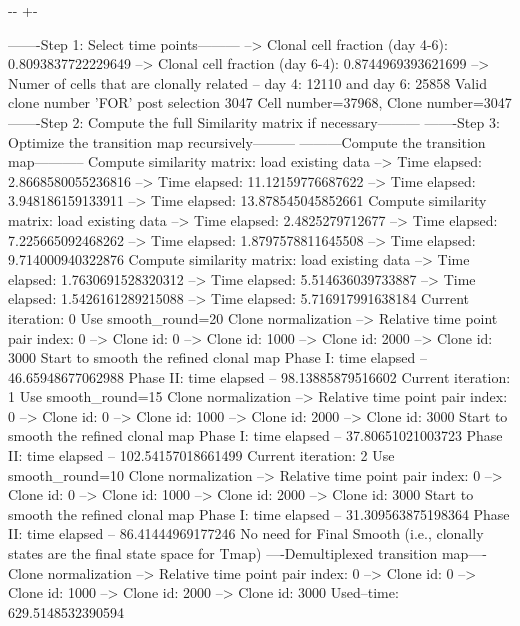 \documentclass[letterpaper,10pt,english]{sphinxmanual}
\newlength\nbsphinxcodecellspacing
\begin{document}
{

\kern-\sphinxverbatimsmallskipamount\kern-\baselineskip
\kern+\FrameHeightAdjust\kern-\fboxrule
\vspace{\nbsphinxcodecellspacing}

\begin{sphinxVerbatim}[commandchars=\\\{\}]
-------Step 1: Select time points---------
--> Clonal cell fraction (day 4-6): 0.8093837722229649
--> Clonal cell fraction (day 6-4): 0.8744969393621699
--> Numer of cells that are clonally related -- day 4: 12110  and day 6: 25858
Valid clone number 'FOR' post selection 3047
Cell number=37968, Clone number=3047
-------Step 2: Compute the full Similarity matrix if necessary---------
-------Step 3: Optimize the transition map recursively---------
---------Compute the transition map-----------
Compute similarity matrix: load existing data
--> Time elapsed:  2.8668580055236816
--> Time elapsed:  11.12159776687622
--> Time elapsed:  3.948186159133911
--> Time elapsed:  13.878545045852661
Compute similarity matrix: load existing data
--> Time elapsed:  2.4825279712677
--> Time elapsed:  7.225665092468262
--> Time elapsed:  1.8797578811645508
--> Time elapsed:  9.714000940322876
Compute similarity matrix: load existing data
--> Time elapsed:  1.7630691528320312
--> Time elapsed:  5.514636039733887
--> Time elapsed:  1.5426161289215088
--> Time elapsed:  5.716917991638184
Current iteration: 0
Use smooth\_round=20
Clone normalization
--> Relative time point pair index: 0
--> Clone id: 0
--> Clone id: 1000
--> Clone id: 2000
--> Clone id: 3000
Start to smooth the refined clonal map
Phase I: time elapsed --  46.65948677062988
Phase II: time elapsed --  98.13885879516602
Current iteration: 1
Use smooth\_round=15
Clone normalization
--> Relative time point pair index: 0
--> Clone id: 0
--> Clone id: 1000
--> Clone id: 2000
--> Clone id: 3000
Start to smooth the refined clonal map
Phase I: time elapsed --  37.80651021003723
Phase II: time elapsed --  102.54157018661499
Current iteration: 2
Use smooth\_round=10
Clone normalization
--> Relative time point pair index: 0
--> Clone id: 0
--> Clone id: 1000
--> Clone id: 2000
--> Clone id: 3000
Start to smooth the refined clonal map
Phase I: time elapsed --  31.309563875198364
Phase II: time elapsed --  86.41444969177246
No need for Final Smooth (i.e., clonally states are the final state space for Tmap)
----Demultiplexed transition map----
Clone normalization
--> Relative time point pair index: 0
--> Clone id: 0
--> Clone id: 1000
--> Clone id: 2000
--> Clone id: 3000
Used--time: 629.5148532390594
\end{sphinxVerbatim}
}
\end{document}
